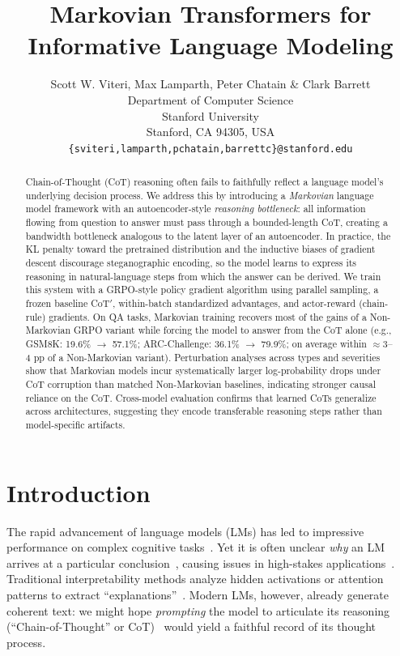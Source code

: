 \documentclass{article} %
\title{Markovian Transformers for Informative Language Modeling}
\author{Scott W. Viteri, Max Lamparth, Peter Chatain \& Clark Barrett \\
Department of Computer Science\\
Stanford University\\
Stanford, CA 94305, USA \\
\texttt{\{sviteri,lamparth,pchatain,barrettc\}@stanford.edu}
}
\begin{document}
\maketitle
\begin{abstract}
Chain-of-Thought (CoT) reasoning often fails to faithfully reflect a language model's underlying decision process. We address this by introducing a \emph{Markovian} language model framework with an autoencoder-style \emph{reasoning bottleneck}: all information flowing from question to answer must pass through a bounded-length CoT, creating a bandwidth bottleneck analogous to the latent layer of an autoencoder. In practice, the KL penalty toward the pretrained distribution and the inductive biases of gradient descent discourage steganographic encoding, so the model learns to express its reasoning in natural-language steps from which the answer can be derived. We train this system with a GRPO-style policy gradient algorithm using parallel sampling, a frozen baseline CoT$'$, within-batch standardized advantages, and actor-reward (chain-rule) gradients. On QA tasks, Markovian training recovers most of the gains of a Non-Markovian GRPO variant while forcing the model to answer from the CoT alone (e.g., GSM8K: 19.6\% $\to$ 57.1\%; ARC-Challenge: 36.1\% $\to$ 79.9\%; on average within $\approx$3--4 pp of a Non-Markovian variant). Perturbation analyses across types and severities show that Markovian models incur systematically larger log-probability drops under CoT corruption than matched Non-Markovian baselines, indicating stronger causal reliance on the CoT. Cross-model evaluation confirms that learned CoTs generalize across architectures, suggesting they encode transferable reasoning steps rather than model-specific artifacts.
\end{abstract}

\section{Introduction}
\label{sec:intro}
The rapid advancement of language models (LMs) has led to impressive performance on complex cognitive tasks~\citep{NEURIPS2020_1457c0d6}. Yet it is often unclear \emph{why} an LM arrives at a particular conclusion~\citep{lamparth2023analyzing,burns2024discovering,gurnee2024language}, causing issues in high-stakes applications~\citep{Grabb2024.04.07.24305462,lamparth2024human,rivera2024escalation}. Traditional interpretability methods analyze hidden activations or attention patterns to extract ``explanations''~\citep{geiger2022inducing,geva2022transformer,meng2022locating,raukur2022toward,wang2022interpretability,lamparth2023analyzing,nanda2023progress}. Modern LMs, however, already generate coherent text: we might hope \emph{prompting} the model to articulate its reasoning (``Chain-of-Thought'' or CoT)~\citep{nye2022show,wei2022chain} would yield a faithful record of its thought process. 
\end{document}
